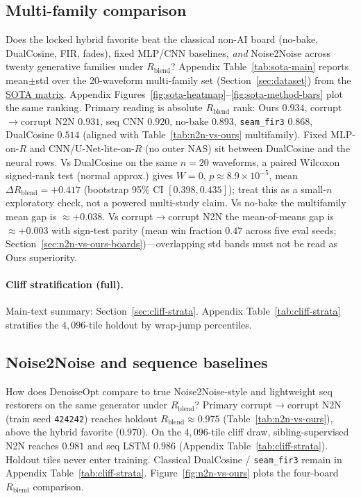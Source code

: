 \subsection{Multi-family comparison}
\label{sec:sota-main}

Does the locked hybrid favorite beat the classical non-AI board (no-bake, DualCosine, FIR, fades),
fixed MLP/CNN baselines, \emph{and} Noise2Noise across twenty generative families under $R_{\mathrm{blend}}$?
Appendix Table~\ref{tab:sota-main} reports mean$\pm$std over the 20-waveform multi-family set (Section~\ref{sec:dataset}) from the \href{https://github.com/reeldemo/denoise-opt-meta/blob/master/paper/Unsupervised_Wrap-Discontinuity_Repair_in_Wavetable_Synthesis_via_Hybrid_GA-PPO_Meta-Search_v12/figures/sota_matrix.json}{SOTA matrix}.
Appendix Figures~\ref{fig:sota-heatmap}--\ref{fig:sota-method-bars} plot the same ranking.
Primary reading is absolute $R_{\mathrm{blend}}$ rank:
Ours $0.934$, corrupt$\to$corrupt N2N $0.931$, seq CNN $0.920$, no-bake $0.893$,
\texttt{seam\_fir3} $0.868$, DualCosine $0.514$
(aligned with Table~\ref{tab:n2n-vs-ours} multifamily).
Fixed MLP-on-$R$ and CNN/U-Net-lite-on-$R$ (no outer NAS) sit between DualCosine and the neural rows.
Vs DualCosine on the same $n{=}20$ waveforms, a paired Wilcoxon signed-rank test (normal approx.) gives $W{=}0$, $p{\approx}8.9{\times}10^{-5}$, mean $\Delta R_{\mathrm{blend}}{=}{+}0.417$ (bootstrap 95\% CI $[0.398,0.435]$); treat this as a small-$n$ exploratory check, not a powered multi-study claim.
Vs no-bake the multifamily mean gap is $\approx{+}0.038$.
Vs corrupt$\to$corrupt N2N the mean-of-means gap is $\approx{+}0.003$ with sign-test parity (mean win fraction $0.47$ across five eval seeds; Section~\ref{sec:n2n-vs-ours-boards})---overlapping std bands must not be read as Ours superiority.

\paragraph{Cliff stratification (full).}
Main-text summary: Section~\ref{sec:cliff-strata}.
Appendix Table~\ref{tab:cliff-strata} stratifies the $4{,}096$-tile holdout by wrap-jump percentiles.

\subsection{Noise2Noise and sequence baselines}
\label{sec:n2n-baselines}

How does DenoiseOpt compare to true Noise2Noise-style and lightweight seq restorers on the same generator under $R_{\mathrm{blend}}$?
Primary corrupt$\to$corrupt N2N (train seed \texttt{424242}) reaches holdout $R_{\mathrm{blend}}\approx 0.975$ (Table~\ref{tab:n2n-vs-ours}), above the hybrid favorite ($0.970$).
On the $4{,}096$-tile cliff draw, sibling-supervised N2N reaches $0.981$ and seq LSTM $0.986$ (Appendix Table~\ref{tab:cliff-strata}).
Holdout tiles never enter training.
Classical DualCosine / \texttt{seam\_fir3} remain in Appendix Table~\ref{tab:cliff-strata}.
Figure~\ref{fig:n2n-vs-ours} plots the four-board $R_{\mathrm{blend}}$ comparison.

